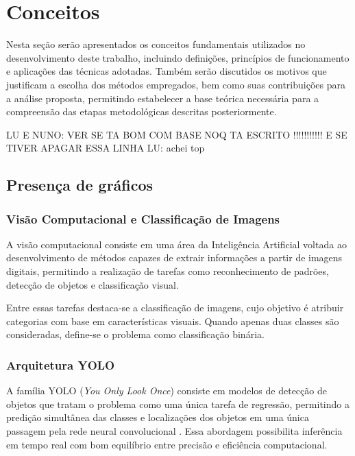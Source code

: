 \documentclass[a4paper,10pt, twocolumn]{article}
\begin{document}
\section{Conceitos}
Nesta seção serão apresentados os conceitos fundamentais utilizados no desenvolvimento deste trabalho, incluindo definições, princípios de funcionamento e aplicações das técnicas adotadas. Também serão discutidos os motivos que justificam a escolha dos métodos empregados, bem como suas contribuições para a análise proposta, permitindo estabelecer a base teórica necessária para a compreensão das etapas metodológicas descritas posteriormente.

LU E NUNO: VER SE TA BOM COM BASE NOQ TA ESCRITO !!!!!!!!!!! E SE TIVER APAGAR ESSA LINHA
LU: achei top

\subsection{Presença de gráficos}

\subsubsection{Visão Computacional e Classificação de Imagens}

A visão computacional consiste em uma área da Inteligência Artificial
voltada ao desenvolvimento de métodos capazes de extrair informações a
partir de imagens digitais, permitindo a realização de tarefas como
reconhecimento de padrões, detecção de objetos e classificação visual.

Entre essas tarefas destaca-se a classificação de imagens, cujo objetivo é atribuir categorias com base em características visuais. Quando apenas duas classes são consideradas, define-se o problema como classificação binária.

\subsubsection{Arquitetura YOLO}

A família YOLO (\textit{You Only Look Once}) consiste em modelos de
detecção de objetos que tratam o problema como uma única tarefa de
regressão, permitindo a predição simultânea das classes e localizações
dos objetos em uma única passagem pela rede neural convolucional
\cite{redmon2016yolo}. Essa abordagem possibilita inferência em tempo
real com bom equilíbrio entre precisão e eficiência computacional.
\end{document}
